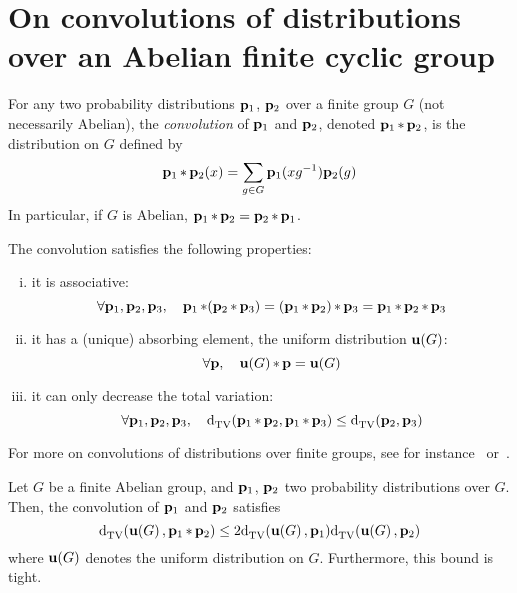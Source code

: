 \section{On convolutions of distributions over an Abelian finite cyclic group}\label{appendix:convolution:abelian}
\begin{definition}
For any two probability distributions $\mathbf{p}_1$, $\mathbf{p}_2$ over a finite group $G$ (not necessarily Abelian), the \emph{convolution} of $\mathbf{p}_1$ and $\mathbf{p}_2$, denoted $\mathbf{p}_1\operatorname{\ast} \mathbf{p}_2$, is the distribution on $G$ defined by
\[
  \mathbf{p}_1\operatorname{\ast} \mathbf{p}_2(x) = \sum_{g\in G} \mathbf{p}_1(x g^{-1})\mathbf{p}_2(g)
\]
In particular, if $G$ is Abelian, $\mathbf{p}_1\operatorname{\ast} \mathbf{p}_2=\mathbf{p}_2\operatorname{\ast} \mathbf{p}_1$.
\end{definition}
\begin{fact}
The convolution satisfies the following properties:
\begin{enumerate}[(i)]
  \item it is associative:
    \begin{equation}
      \forall \mathbf{p}_1,\mathbf{p}_2,\mathbf{p}_3, \quad \mathbf{p}_1\operatorname{\ast} (\mathbf{p}_2\operatorname{\ast} \mathbf{p}_3) = (\mathbf{p}_1\operatorname{\ast} \mathbf{p}_2)\operatorname{\ast} \mathbf{p}_3 = \mathbf{p}_1\operatorname{\ast} \mathbf{p}_2\operatorname{\ast} \mathbf{p}_3
    \end{equation}
  \item it has a (unique) absorbing element, the uniform distribution $\mathbf{u}\!\left( G \right) $:
    \begin{equation}
      \forall \mathbf{p}, \quad \mathbf{u}\!\left( G \right) \operatorname{\ast} \mathbf{p} = \mathbf{u}\!\left( G \right) 
    \end{equation}
  \item it can only decrease the total variation:
    \begin{equation}
      \forall \mathbf{p}_1,\mathbf{p}_2,\mathbf{p}_3, \quad {\operatorname{d}_{\rm{TV}}^{}\!\left({ \ensuremath{\mathbf{p}}_1\operatorname{\ast}\ensuremath{\mathbf{p}}_2 ,  \ensuremath{\mathbf{p}}_1\operatorname{\ast}\ensuremath{\mathbf{p}}_3 }\right)} \leq {\operatorname{d}_{\rm{TV}}^{}\!\left({ \ensuremath{\mathbf{p}}_2 ,  \ensuremath{\mathbf{p}}_3 }\right)}
    \end{equation}
  \end{enumerate}
\end{fact}
\noindent For more on convolutions of distributions over finite groups, see for instance~\cite{Diaconis:88} or~\cite{BCLR:08}.

\begin{fact}\label{fact:convol:uniform:tv}
Let $G$ be a finite Abelian group, and $\mathbf{p}_1$, $\mathbf{p}_2$ two probability distributions over $G$. Then, the convolution of $\mathbf{p}_1$ and $\mathbf{p}_2$ satisfies
\begin{equation}\label{eq:convol:uniform:tv}
  {\operatorname{d}_{\rm{TV}}^{}\!\left({ \ensuremath{\mathbf{u}\!\left( G \right) } ,  \ensuremath{\mathbf{p}}_1\operatorname{\ast}\ensuremath{\mathbf{p}}_2 }\right)} \leq 2{\operatorname{d}_{\rm{TV}}^{}\!\left({ \mathbf{u}\!\left( G \right)  ,  \mathbf{p}_1 }\right)}{\operatorname{d}_{\rm{TV}}^{}\!\left({ \mathbf{u}\!\left( G \right)  ,  \mathbf{p}_2 }\right)}
\end{equation}
where $\mathbf{u}\!\left( G \right) $ denotes the uniform distribution on $G$. Furthermore, this bound is tight.
\end{fact}


